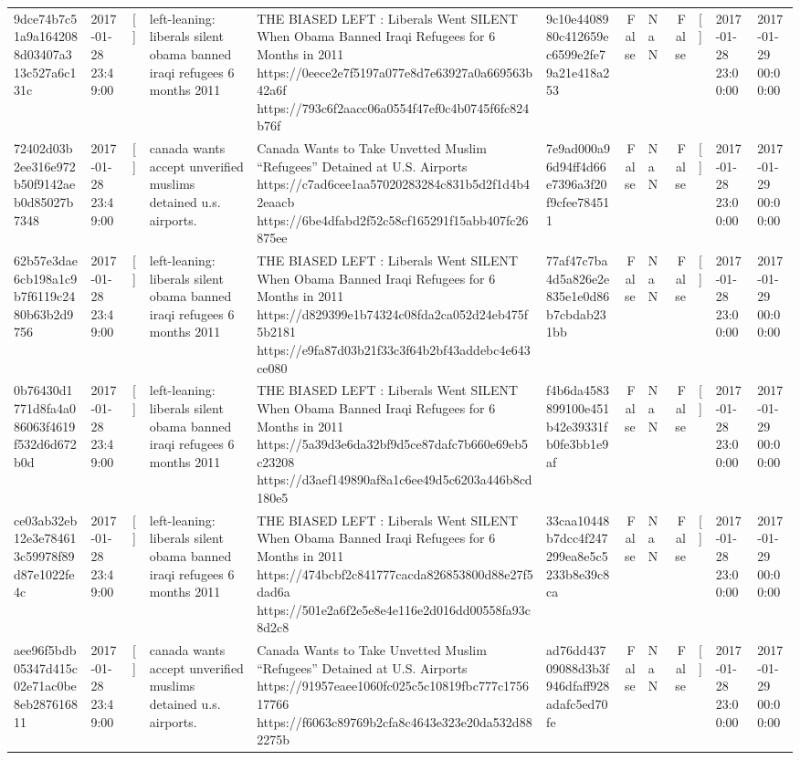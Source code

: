 \begin{tabular}{llllllrlrlll}
9dce74b7c51a9a1642088d03407a313c527a6c131c & 2017-01-28 23:49:00 & [] & left-leaning: liberals silent obama banned iraqi refugees 6 months 2011 & THE BIASED LEFT : Liberals Went SILENT When Obama Banned Iraqi Refugees for 6 Months in 2011 https://0eece2e7f5197a077e8d7e63927a0a669563b42a6f https://793c6f2aacc06a0554f47ef0c4b0745f6fc824b76f & 9c10e4408980c412659ec6599e2fe79a21e418a253 & False & NaN & False & [] & 2017-01-28 23:00:00 & 2017-01-29 00:00:00 \\
72402d03b2ee316e972b50f9142aeb0d85027b7348 & 2017-01-28 23:49:00 & [] & canada wants accept unverified muslims detained u.s. airports. & Canada Wants to Take Unvetted Muslim “Refugees” Detained at U.S. Airports https://c7ad6cee1aa57020283284c831b5d2f1d4b42eaacb https://6be4dfabd2f52c58cf165291f15abb407fc26875ee & 7e9ad000a96d94ff4d66e7396a3f20f9cfee784511 & False & NaN & False & [] & 2017-01-28 23:00:00 & 2017-01-29 00:00:00 \\
62b57e3dae6cb198a1c9b7f6119c2480b63b2d9756 & 2017-01-28 23:49:00 & [] & left-leaning: liberals silent obama banned iraqi refugees 6 months 2011 & THE BIASED LEFT : Liberals Went SILENT When Obama Banned Iraqi Refugees for 6 Months in 2011 https://d829399e1b74324c08fda2ca052d24eb475f5b2181 https://e9fa87d03b21f33c3f64b2bf43addebc4e643ce080 & 77af47c7ba4d5a826e2e835e1e0d86b7cbdab231bb & False & NaN & False & [] & 2017-01-28 23:00:00 & 2017-01-29 00:00:00 \\
0b76430d1771d8fa4a086063f4619f532d6d672b0d & 2017-01-28 23:49:00 & [] & left-leaning: liberals silent obama banned iraqi refugees 6 months 2011 & THE BIASED LEFT : Liberals Went SILENT When Obama Banned Iraqi Refugees for 6 Months in 2011 https://5a39d3e6da32bf9d5ce87dafc7b660e69eb5c23208 https://d3aef149890af8a1c6ee49d5c6203a446b8cd180e5 & f4b6da4583899100e451b42e39331fb0fe3bb1e9af & False & NaN & False & [] & 2017-01-28 23:00:00 & 2017-01-29 00:00:00 \\
ce03ab32eb12e3e784613c59978f89d87e1022fe4c & 2017-01-28 23:49:00 & [] & left-leaning: liberals silent obama banned iraqi refugees 6 months 2011 & THE BIASED LEFT : Liberals Went SILENT When Obama Banned Iraqi Refugees for 6 Months in 2011 https://474bcbf2c841777cacda826853800d88e27f5dad6a https://501e2a6f2e5e8e4e116e2d016dd00558fa93c8d2c8 & 33caa10448b7dcc4f247299ea8e5c5233b8e39c8ca & False & NaN & False & [] & 2017-01-28 23:00:00 & 2017-01-29 00:00:00 \\
aee96f5bdb05347d415c02e71ac0be8eb287616811 & 2017-01-28 23:49:00 & [] & canada wants accept unverified muslims detained u.s. airports. & Canada Wants to Take Unvetted Muslim “Refugees” Detained at U.S. Airports https://91957eaee1060fc025c5c10819fbc777c175617766 https://f6063c89769b2cfa8c4643e323e20da532d882275b & ad76dd43709088d3b3f946dfaff928adafc5ed70fe & False & NaN & False & [] & 2017-01-28 23:00:00 & 2017-01-29 00:00:00 \\

\end{tabular}
